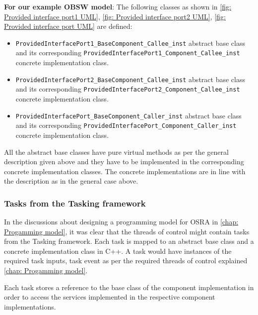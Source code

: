 \textbf{For our example OBSW model}: The following classes as shown in \cref{fig: Provided interface port1 UML}, \cref{fig: Provided interface port2 UML}, \cref{fig: Provided interface port UML} are defined:
\begin{itemize}
\item \texttt{Provided\allowbreak Interface\allowbreak Port1\_\allowbreak Base\allowbreak Component\_\allowbreak Callee\_\allowbreak inst} abstract base class and its corresponding \texttt{Provided\allowbreak Interface\allowbreak Port1\_\allowbreak Component\_\allowbreak Callee\_\allowbreak inst} concrete implementation class.
\item \texttt{Provided\allowbreak Interface\allowbreak Port2\_\allowbreak Base\allowbreak Component\_\allowbreak Callee\_\allowbreak inst} abstract base class and its corresponding \texttt{Provided\allowbreak Interface\allowbreak Port2\_\allowbreak Component\_\allowbreak Callee\_\allowbreak inst} concrete implementation class.
\item \texttt{Provided\allowbreak Interface\allowbreak Port\_\allowbreak Base\allowbreak Component\_\allowbreak Caller\_\allowbreak inst} abstract base class and its corresponding \texttt{Provided\allowbreak Interface\allowbreak Port\_\allowbreak Component\_\allowbreak Caller\_\allowbreak inst} concrete implementation class. 
\end{itemize} 

All the abstract base classes have pure virtual methods as per the general description given above and they have to be implemented in the corresponding concrete implementation classes. The concrete implementations are in line with the description as in the general case above.

\subsubsection{\textbf{Tasks from the Tasking framework}}
In the discussions about designing a programming model for OSRA in \cref{chap: Progamming model}, it was clear that the threads of control might contain tasks from the Tasking framework. Each task is mapped to an abstract base class and a concrete implementation class in C++. A task would have instances of the required task inputs, task event as per the required threads of control explained \cref{chap: Progamming model}.

Each task stores a reference to the base class of the component implementation in order to access the services implemented in the respective component implementations.  


